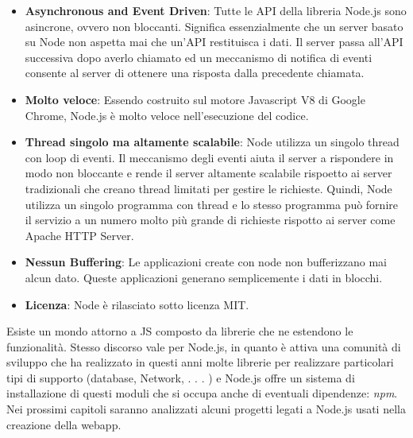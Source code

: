 \begin{itemize}
\item \textbf{Asynchronous and Event Driven}: Tutte le API della libreria Node.js sono asincrone, ovvero non bloccanti. Significa essenzialmente che un server basato su Node non aspetta mai che un'API restituisca i dati. Il server passa all'API successiva dopo averlo chiamato ed un meccanismo di notifica di eventi consente al server di ottenere una risposta dalla precedente chiamata.
\item \textbf{Molto veloce}: Essendo costruito sul motore Javascript V8 di Google Chrome, Node.js è molto veloce nell'esecuzione del codice.
\item \textbf{Thread singolo ma altamente scalabile}: Node utilizza un singolo thread con loop di eventi. Il meccanismo degli eventi aiuta il server a rispondere in modo non bloccante e rende il server altamente scalabile rispoetto ai server tradizionali che creano thread limitati per gestire le richieste. Quindi, Node utilizza un singolo programma con thread e lo stesso programma può fornire il servizio a un numero molto più grande di richieste rispotto ai server come Apache HTTP Server.
\item \textbf{Nessun Buffering}: Le applicazioni create con node non bufferizzano mai alcun dato. Queste applicazioni generano semplicemente i dati in blocchi.
\item \textbf{Licenza}: Node è rilasciato sotto licenza MIT. 
\end{itemize}
Esiste un mondo attorno a JS composto da librerie che ne estendono le funzionalità. Stesso discorso vale per Node.js, in quanto è attiva una comunità di sviluppo che ha realizzato in questi anni molte librerie per realizzare particolari tipi di supporto (database, Network, . . . ) e Node.js offre un sistema di installazione di questi moduli che si occupa anche di eventuali dipendenze: \textit{npm}. Nei prossimi capitoli saranno analizzati alcuni progetti legati a Node.js usati nella creazione della webapp.

